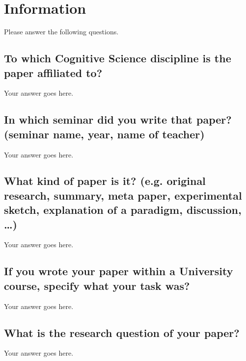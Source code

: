 \section{Information}
\textcolor{cssj_purple}{Please answer the following questions.}

\subsection*{To which Cognitive Science discipline is the paper affiliated to?}
\textcolor{cssj_purple}{Your answer goes here.}

\subsection*{In which seminar did you write that paper? (seminar name, year, name of teacher)} 
\textcolor{cssj_purple}{Your answer goes here.}

\subsection*{What kind of paper is it? (e.g. original research, summary, meta paper, experimental sketch, explanation of a paradigm, discussion, …)}
\textcolor{cssj_purple}{Your answer goes here.}

\subsection*{If you wrote your paper within a University course, specify what your task was?}
\textcolor{cssj_purple}{Your answer goes here.}

\subsection*{What is the research question of your paper?}
\textcolor{cssj_purple}{Your answer goes here.}